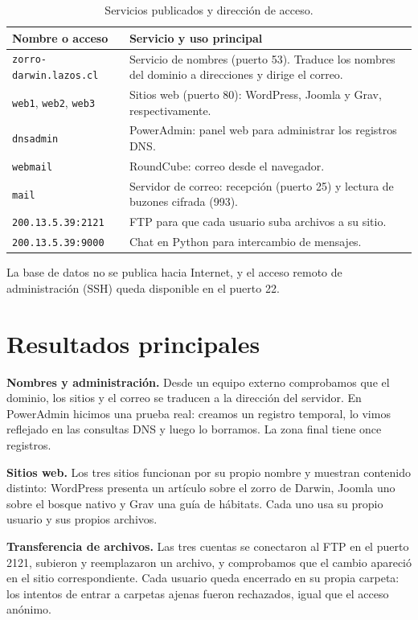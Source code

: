 \documentclass[11pt,a4paper]{article}
\begin{document}
\begin{table}[htbp]\centering\small
\caption{Servicios publicados y dirección de acceso.}\label{tab:servicios}
\renewcommand{\arraystretch}{1.13}
\begin{tabularx}{\linewidth}{@{}p{4.4cm}X@{}}\toprule
Nombre o acceso & Servicio y uso principal \\\midrule
\nolinkurl{zorro-darwin.lazos.cl} & Servicio de nombres (puerto 53). Traduce los nombres del dominio a direcciones y dirige el correo. \\
\texttt{web1}, \texttt{web2}, \texttt{web3} & Sitios web (puerto 80): WordPress, Joomla y Grav, respectivamente. \\
\texttt{dnsadmin} & PowerAdmin: panel web para administrar los registros DNS. \\
\texttt{webmail} & RoundCube: correo desde el navegador. \\
\texttt{mail} & Servidor de correo: recepción (puerto 25) y lectura de buzones cifrada (993). \\
\texttt{200.13.5.39:2121} & FTP para que cada usuario suba archivos a su sitio. \\
\texttt{200.13.5.39:9000} & Chat en Python para intercambio de mensajes. \\
\bottomrule\end{tabularx}
\end{table}

La base de datos no se publica hacia Internet, y el acceso remoto de administración (SSH) queda disponible en el puerto 22.

\section{Resultados principales}
\textbf{Nombres y administración.} Desde un equipo externo comprobamos que el dominio, los sitios y el correo se traducen a la dirección del servidor. En PowerAdmin hicimos una prueba real: creamos un registro temporal, lo vimos reflejado en las consultas DNS y luego lo borramos. La zona final tiene once registros.

\textbf{Sitios web.} Los tres sitios funcionan por su propio nombre y muestran contenido distinto: WordPress presenta un artículo sobre el zorro de Darwin, Joomla uno sobre el bosque nativo y Grav una guía de hábitats. Cada uno usa su propio usuario y sus propios archivos.

\textbf{Transferencia de archivos.} Las tres cuentas se conectaron al FTP en el puerto 2121, subieron y reemplazaron un archivo, y comprobamos que el cambio apareció en el sitio correspondiente. Cada usuario queda encerrado en su propia carpeta: los intentos de entrar a carpetas ajenas fueron rechazados, igual que el acceso anónimo.
\end{document}
